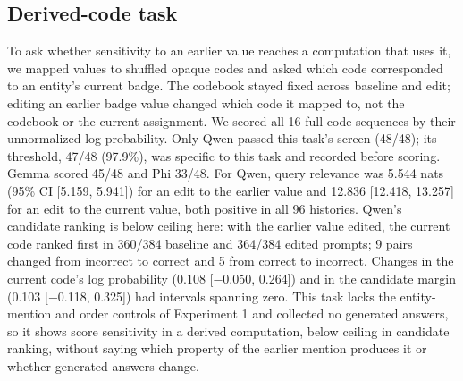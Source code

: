 \subsection{Derived-code task}
\label{app:derived-code}

To ask whether sensitivity to an earlier value reaches a computation that uses it, we mapped values to shuffled opaque codes and asked which code corresponded to an entity's current badge. The codebook stayed fixed across baseline and edit; editing an earlier badge value changed which code it mapped to, not the codebook or the current assignment. We scored all 16 full code sequences by their unnormalized log probability. Only Qwen passed this task's screen (48/48); its threshold, 47/48 (97.9\%), was specific to this task and recorded before scoring. Gemma scored 45/48 and Phi 33/48. For Qwen, query relevance was 5.544 nats (95\% CI [5.159, 5.941]) for an edit to the earlier value and 12.836 [12.418, 13.257] for an edit to the current value, both positive in all 96 histories. Qwen's candidate ranking is below ceiling here: with the earlier value edited, the current code ranked first in 360/384 baseline and 364/384 edited prompts; 9 pairs changed from incorrect to correct and 5 from correct to incorrect. Changes in the current code's log probability (0.108 [−0.050, 0.264]) and in the candidate margin (0.103 [−0.118, 0.325]) had intervals spanning zero. This task lacks the entity-mention and order controls of Experiment 1 and collected no generated answers, so it shows score sensitivity in a derived computation, below ceiling in candidate ranking, without saying which property of the earlier mention produces it or whether generated answers change.

\FloatBarrier
